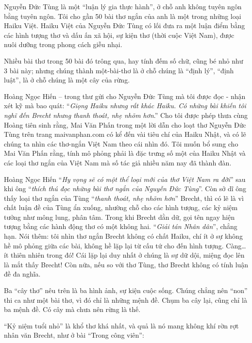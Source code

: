 \documentclass[../main.tex]{subfiles}
\begin{document}
\begin{multicols}{2}
Nguyễn Đức Tùng là một “luận lý gia thực hành”, ở chỗ anh không tuyên ngôn bằng tuyên ngôn. Tôi cho gần 50 bài thơ ngắn của anh là một trong những loại Haiku Việt. Haiku Việt của Nguyễn Đức Tùng có lối đưa ra một luận điểm bằng các hình tượng thơ và dấu ấn xã hội, sự kiện thơ (thời cuộc Việt Nam), được nuôi dưỡng trong phong cách giễu nhại. 
 
Nhiều bài thơ trong 50 bài đó trông qua, hay tính đếm số chữ, cũng bé nhỏ như 3 bài này; nhưng chúng thành một-bài-thơ là ở chỗ chúng là “định lý”, “định luật”, là ở chỗ chúng là một cây của rừng.  
 
Hoàng Ngọc Hiến – trong thư gửi cho Nguyễn Đức Tùng mà tôi được đọc - nhận xét kỹ mà bao quát: “\textit{Giọng Haiku nhưng rất khác Haiku. Có những bài khiến tôi nghĩ đến Brecht nhưng thanh thoát, nhẹ nhõm hơn}.” Cho tôi được phép thưa cùng Hoàng tiên sinh rằng, Mai Văn Phấn trong một lời dẫn cho loạt thơ Nguyễn Đức Tùng trên trang maivanphan.com có kể đến vài tiêu chí của Haiku Nhật, và có lẽ chúng ta nhìn các thơ-ngắn Việt Nam theo cái nhìn đó. Tôi muốn bổ sung cho Mai Văn Phấn rằng, tính mô phỏng phải là đặc trưng số một của Haiku Nhật và các loại thơ ngắn của Việt Nam mà số tác giả nhiều năm nay đã thành đàn.  
 
Hoàng Ngọc Hiến “\textit{Hy vọng sẽ có một thể loại mới của thơ Việt Nam ra đời}” sau khi ông “\textit{thích thú đọc những bài thơ ngắn của Nguyễn Đức Tùng}”. Còn sở dĩ ông thấy loại thơ ngắn của Tùng “\textit{thanh thoát, nhẹ nhõm hơn}” Brecht, thì có lẽ là vì chất luận đề của Tùng ẩn xuống, nhường chỗ cho các hình tượng, các kỷ niệm tưởng như mông lung, phân tâm. Trong khi Brecht dằn dữ, gọi tên ngay hiện tượng bằng các hành động thơ có một không hai. “\textit{Giải tán Nhân dân}”, chẳng hạn. Nói thêm: tôi nhìn thơ ngắn Brecht không có chất Haiku, chí ít ở sự không hề mô phỏng giữa các bài, không hề lặp lại từ cấu tứ cho đến hình tượng. Càng… ít thiên nhiên trong đó! Cái lặp lại duy nhất ở chúng là sự dữ dội, miệng đọc lên là mắt thấy Brecht! Còn nữa, nếu so với thơ Tùng, thơ Brecht không có tính luận đề đa nghĩa. 
 
Ba “cây thơ” nêu trên là ba hình ảnh, sự kiện cuộc sống. Chúng chẳng nên “non” thi ca như một bài thơ, vì đó chỉ là những mệnh đề. Chụm ba cây lại, cũng chỉ là ba mệnh đề. Có cây mà chưa nên rừng là thế. 
 
“Kỷ niệm tuổi nhỏ” là khổ thơ khá nhất, và quả là nó mang không khí rờn rợt nhân văn Brecht, như ở bài “Trong công viên”: 
\begin{blockquote}
        

\end{blockquote}
\end{multicols}
\end{document}
